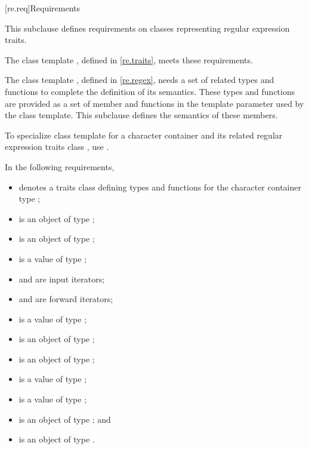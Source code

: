 [re.req]{Requirements}

\pnum
This subclause defines requirements on classes representing regular
expression traits.
\begin{note}
The class template
, defined in \ref{re.traits},
meets these requirements.
\end{note}

\pnum
The class template , defined in
\ref{re.regex}, needs a set of related types and
functions to complete the definition of its semantics. These types
and functions are provided as a set of member  and functions
in the template parameter  used by the  class
template. This subclause defines the semantics of these
members.

\pnum
To specialize class template  for a character
container  and its related regular
expression traits class , use .

\pnum
{}%
%
%
%
In the following requirements,
\begin{itemize}
\item
{} denotes a traits class defining types and functions
for the character container type ;
\item
{} is an object of type ;
\item
{} is an object of type ;
\item
{} is a value of type ;
\item
{} and  are input iterators;
\item
{} and  are forward iterators;
\item
{} is a value of type ;
\item
{} is an object of type ;
\item
{} is an object of type ;
\item
{} is a value of  type ;
\item
{} is a value of type ;
\item
{} is an object of type ; and
\item
{} is an object of type .
\end{itemize}

